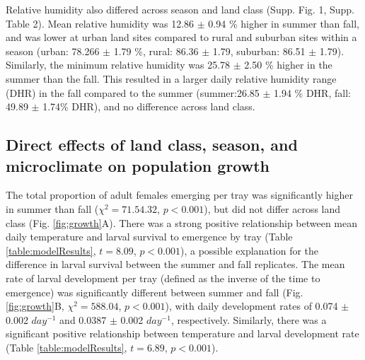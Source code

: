\documentclass[12pt]{article}
\begin{document}
Relative humidity also differed across season and land class (Supp. Fig. 1, Supp. Table 2). Mean relative humidity was 12.86 $\pm$ 0.94 \% higher in summer than fall, and was lower at urban land sites compared to rural and suburban sites within a season (urban: 78.266 $\pm$ 1.79 \%, rural: 86.36 $\pm$ 1.79, suburban: 86.51 $\pm$ 1.79). Similarly, the minimum relative humidity was 25.78 $\pm$ 2.50 \% higher in the summer than the fall. This resulted in a larger daily relative humidity range (DHR) in the fall compared to the summer (summer:26.85 $\pm$ 1.94 \% DHR, fall: 49.89 $\pm$ 1.74\% DHR), and no difference across land class.

\subsection{Direct effects of land class, season, and microclimate on population growth}

The total proportion of adult females emerging per tray was significantly higher in summer than fall ($\chi^2=71.54.32$, $p<0.001$), but did not differ across land class (Fig. \ref{fig:growth}A). There was a strong positive relationship between mean daily temperature and larval survival to emergence by tray (Table \ref{table:modelResults}, $t=8.09$, $p<0.001$), a possible explanation for the difference in larval survival between the summer and fall replicates. The mean rate of larval development per tray (defined as the inverse of the time to emergence) was significantly different between summer and fall (Fig. \ref{fig:growth}B, $\chi^2=588.04$, $p<0.001$), with daily development rates of 0.074 $\pm$ 0.002 $day^{-1}$ and 0.0387 $\pm$ 0.002 $day^{-1}$, respectively. Similarly, there was a significant positive relationship between temperature and larval development rate (Table \ref{table:modelResults}, $t=6.89$, $p<0.001$).
\end{document}
